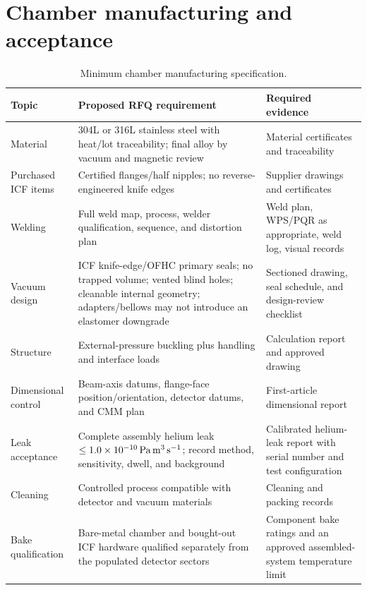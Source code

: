 \documentclass[10pt,letterpaper]{article}
\begin{document}
\section{Chamber manufacturing and acceptance}

\begin{table}[htbp]
  \centering
  \small
  \caption{Minimum chamber manufacturing specification.}
  \begin{tabularx}{\textwidth}{L{0.18\textwidth}Y Y}
    \toprule
    Topic & Proposed RFQ requirement & Required evidence \\
    \midrule
    Material & 304L or 316L stainless steel with heat/lot traceability; final alloy by
      vacuum and magnetic review & Material certificates and traceability \\
    Purchased ICF items & Certified flanges/half nipples; no reverse-engineered knife edges &
      Supplier drawings and certificates \\
    Welding & Full weld map, process, welder qualification, sequence, and distortion plan &
      Weld plan, WPS/PQR as appropriate, weld log, visual records \\
    Vacuum design & ICF knife-edge/OFHC primary seals; no trapped volume; vented blind holes;
      cleanable internal geometry; adapters/bellows may not introduce an elastomer downgrade &
      Sectioned drawing, seal schedule, and design-review checklist \\
    Structure & External-pressure buckling plus handling and interface loads &
      Calculation report and approved drawing \\
    Dimensional control & Beam-axis datums, flange-face position/orientation, detector
      datums, and CMM plan & First-article dimensional report \\
    Leak acceptance & Complete assembly helium leak
      $\leq1.0\times10^{-10}\,\si{\pascal\meter\cubed\per\second}$;
      record method, sensitivity, dwell, and background &
      Calibrated helium-leak report with serial number and test configuration \\
    Cleaning & Controlled process compatible with detector and vacuum materials &
      Cleaning and packing records \\
    Bake qualification & Bare-metal chamber and bought-out ICF hardware qualified separately
      from the populated detector sectors & Component bake ratings and an approved
      assembled-system temperature limit \\
    \bottomrule
  \end{tabularx}
\end{table}
\end{document}
